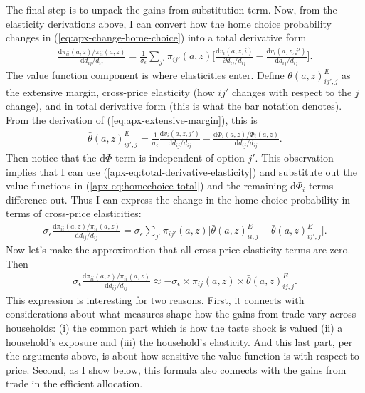 \documentclass[12pt,pdftex]{article}
\begin{document}
\begin{onehalfspacing}
The final step is to unpack the gains from substitution term. Now, from the elasticity derivations above, I can convert how the home choice probability changes in (\ref{eq:apx-change-home-choice}) into a total derivative form
\begin{align}
\frac{\mathrm{d} \pi_{ii}(a,z) / \pi_{ii}(a,z) }{\mathrm{d} d_{ij} / d_{ij}} = \frac{1}{\sigma_{\epsilon}} \sum_{j'} \pi_{ij'}(a,z) \bigg[ \frac{\mathrm{d} v_{i}(a,z,i)}{\partial d_{ij}/d_{ij}} - \frac{\mathrm{d} v_{i}(a,z,j')}{\mathrm{d} d_{ij}/d_{ij}} \bigg].
\label{apx-eq:homechoice-total}
\end{align}
The value function component is where elasticities enter. Define $\bar{\theta}(a,z) ^E_{ij',j}$ as the extensive margin, cross-price elasticity (how $ij'$ changes with respect to the $j$ change), and in total derivative form (this is what the bar notation denotes). From the derivation of (\ref{eq:apx-extensive-margin}), this is
\begin{align}
\bar{\theta}(a,z) ^E_{ij',j} = \frac{1}{\sigma_{\epsilon}}\frac{\mathrm{d} v_{i}(a, z, j')}{\mathrm{d} d_{ij}/d_{ij}} -  \frac{\mathrm{d} \Phi_{i}(a,z) / \Phi_{i}(a,z)}{\mathrm{d} d_{ij}/d_{ij}}.
\label{apx-eq:total-derivative-elasticity}
\end{align}
Then notice that the $\mathrm{d} \Phi$ term is independent of option $j'$. This observation implies that I can use (\ref{apx-eq:total-derivative-elasticity}) and substitute out the value functions in (\ref{apx-eq:homechoice-total}) and the remaining $\mathrm{d} \Phi_{i}$ terms difference out. Thus I can express the change in the home choice probability in terms of cross-price elasticities:
\begin{align}
\sigma_{\epsilon} \frac{\mathrm{d} \pi_{ii}(a,z) / \pi_{ii}(a,z) }{\mathrm{d} d_{ij} / d_{ij}} = \sigma_{\epsilon} \sum_{j'} \pi_{ij'}(a,z) \bigg[ \bar{\theta}(a,z) ^E_{ii,j} - \bar{\theta}(a,z) ^E_{ij',j}\bigg].
\end{align}
Now let's make the approximation that all cross-price elasticity terms are zero. Then
\begin{align}
\sigma_{\epsilon} \frac{\mathrm{d} \pi_{ii}(a,z) / \pi_{ii}(a,z) }{\mathrm{d} d_{ij} / d_{ij}} \approx
- \sigma_{\epsilon} \times \pi_{ij}(a,z) \times \bar{\theta}(a,z) ^E_{ij,j}.
\end{align}
This expression is interesting for two reasons. First, it connects with considerations about what measures shape how the gains from trade vary across households: (i) the common part which is how the taste shock is valued (ii) a household's exposure and (iii) the household's elasticity. And this last part, per the arguments above, is about how sensitive the value function is with respect to price. Second, as I show below, this formula also connects with the gains from trade in the efficient allocation. 



\end{onehalfspacing}
\end{document}
